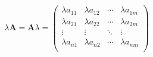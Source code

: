 \begin{equation*}
	\lambda \bm{A} = \bm{A} \lambda =
	\begin{pmatrix}
		\lambda a_{11} & \lambda a_{12} & \cdots & \lambda a_{1m} \\
		\lambda a_{21} & \lambda a_{22} & \cdots & \lambda a_{2m} \\
		\vdots         & \vdots         & \ddots & \vdots         \\
		\lambda a_{n1} & \lambda a_{n2} & \cdots & \lambda a_{nm} \\
	\end{pmatrix}
\end{equation*}

